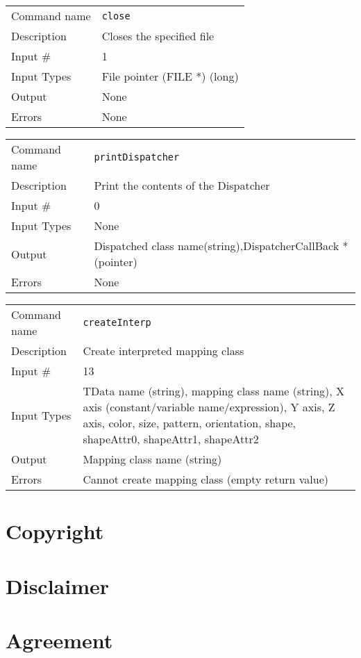\bigskip

\noindent
\begin{tabular}{l|p{5in}}
\hline
Command name & {\tt close} \\
Description  & Closes the specified file \\
Input \#     & 1 \\
Input Types  & File pointer (FILE *) (long) \\
Output       & None \\
Errors       & None \\
\hline
\end{tabular}

\bigskip

\noindent
\begin{tabular}{l|p{5in}}
\hline
Command name & {\tt printDispatcher} \\
Description  & Print the contents of the Dispatcher \\
Input \#     & 0 \\
Input Types  & None \\
Output       & Dispatched class name(string),DispatcherCallBack * (pointer) \\
Errors       & None \\
\hline
\end{tabular}

\bigskip

\noindent
\begin{tabular}{l|p{5in}}
\hline
Command name & {\tt createInterp} \\
Description  & Create interpreted mapping class \\
Input \#     & 13 \\
Input Types  & TData name (string), mapping class name (string),
               X axis (constant/variable name/expression),
               Y axis, Z axis, color, size, pattern, orientation, shape,
               shapeAttr0, shapeAttr1, shapeAttr2 \\
Output       & Mapping class name (string) \\
Errors       & Cannot create mapping class (empty return value) \\
\hline
\end{tabular}

\newpage 
\section*{Copyright}



\section*{Disclaimer}



\newpage
\section*{Agreement}





